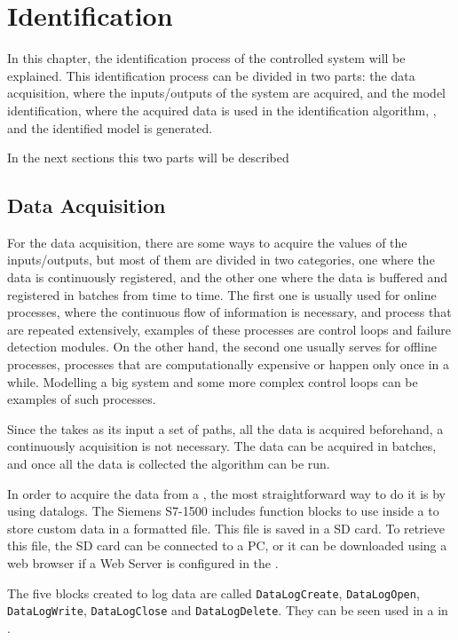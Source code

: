 
\chapter{Identification}
\label{cha:ident}
In this chapter, the identification process of the controlled system will be
explained. This identification process can be divided in two parts: the data acquisition, where the inputs\slash outputs of the system are
  acquired, and the model identification, where the acquired data is
  used in the identification algorithm, , and the
  identified model is generated.
  
In the next sections this two parts will be described

\section{Data Acquisition}
For the data acquisition, there are some ways to acquire the values of the
inputs\slash outputs, but most of them are divided in two categories, one where
the data is continuously registered, and the other one where the data is buffered
and registered in batches from time to time.
The first one is usually used for online processes, where the continuous flow of
information is necessary, and process that are repeated
extensively, examples of these processes are control loops and failure
detection modules. On the other hand, the second one usually serves for offline
processes, processes that are computationally expensive or happen only once in a
while. Modelling a big system and some more complex control loops can be examples of
such processes. 

Since the
 takes as its input a set of paths, all the data is
acquired beforehand, a continuously acquisition is not necessary. The data can
be acquired in batches, and once all the data is collected the algorithm can be
run.

In order to acquire the data from a \PLC{}, the most straightforward way to do
it is by using datalogs. The Siemens \PLC{} S7-1500 includes function blocks to
use inside a \LD{} to store custom data in a \CSV{} formatted file. This file is
saved in a SD card. To retrieve this file, the SD card can be connected to a PC,
or it can be downloaded using a web browser if a Web Server is configured in the
\PLC.

The five blocks created to log data are called
\verb|DataLogCreate|,
\verb|DataLogOpen|, \verb|DataLogWrite|, \verb|DataLogClose| and \verb|DataLogDelete|.
They can be seen used in a \LD{} in .

